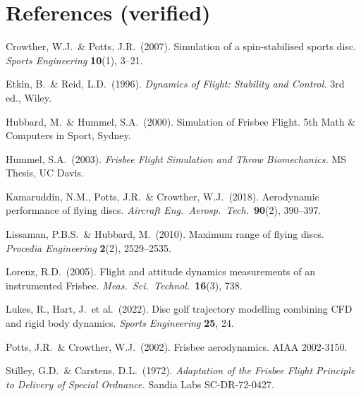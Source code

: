 \documentclass[11pt,letterpaper]{article}
\begin{document}
\section*{References (verified)}

\begin{description}[font=\normalfont\itshape,leftmargin=1em]
  \item Crowther, W.J.\ \& Potts, J.R.\ (2007). Simulation of a spin-stabilised sports disc. \emph{Sports Engineering} \textbf{10}(1), 3--21.
  \item Etkin, B.\ \& Reid, L.D.\ (1996). \emph{Dynamics of Flight: Stability and Control.} 3rd ed., Wiley.
  \item Hubbard, M.\ \& Hummel, S.A.\ (2000). Simulation of Frisbee Flight. 5th Math \& Computers in Sport, Sydney.
  \item Hummel, S.A.\ (2003). \emph{Frisbee Flight Simulation and Throw Biomechanics.} MS Thesis, UC Davis.
  \item Kamaruddin, N.M., Potts, J.R.\ \& Crowther, W.J.\ (2018). Aerodynamic performance of flying discs. \emph{Aircraft Eng.\ Aerosp.\ Tech.}\ \textbf{90}(2), 390--397.
  \item Lissaman, P.B.S.\ \& Hubbard, M.\ (2010). Maximum range of flying discs. \emph{Procedia Engineering} \textbf{2}(2), 2529--2535.
  \item Lorenz, R.D.\ (2005). Flight and attitude dynamics measurements of an instrumented Frisbee. \emph{Meas.\ Sci.\ Technol.}\ \textbf{16}(3), 738.
  \item Lukes, R., Hart, J.\ et al.\ (2022). Disc golf trajectory modelling combining CFD and rigid body dynamics. \emph{Sports Engineering} \textbf{25}, 24.
  \item Potts, J.R.\ \& Crowther, W.J.\ (2002). Frisbee\texttrademark{} aerodynamics. AIAA 2002-3150.
  \item Stilley, G.D.\ \& Carstens, D.L.\ (1972). \emph{Adaptation of the Frisbee Flight Principle to Delivery of Special Ordnance.} Sandia Labs SC-DR-72-0427.
\end{description}
\end{document}
